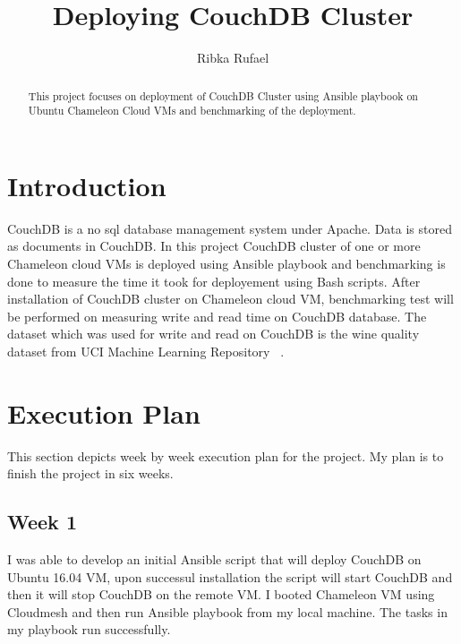 \title{Deploying CouchDB Cluster}


\author{Ribka Rufael}
\orcid{}



\renewcommand{\shortauthors}{R. Rufael}


\begin{abstract}
  This project focuses on deployment of CouchDB Cluster using Ansible
  playbook on Ubuntu Chameleon Cloud VMs and benchmarking of the
  deployment.
\end{abstract}



\maketitle

\section{Introduction}

CouchDB \cite{www-Couchdb} is a no sql database management system
under Apache. Data is stored as documents in CouchDB. In this project
CouchDB cluster of one or more Chameleon cloud VMs is deployed using
Ansible playbook and benchmarking is done to measure the time it took
for deployement using Bash scripts. After installation of CouchDB
cluster on Chameleon cloud VM, benchmarking test will be performed on
measuring write and read time on CouchDB database. The dataset which
was used for write and read on CouchDB is the wine quality dataset
from UCI Machine Learning Repository  ~\cite{www-WineQuality}.

\section{Execution Plan}

This section depicts week by week execution plan for the project. My
plan is to finish the project in six weeks.

\subsection{Week 1}

I was able to develop an initial Ansible script that will deploy
CouchDB on Ubuntu 16.04 VM, upon successul installation the script
will start CouchDB and then it will stop CouchDB on the remote VM. I
booted Chameleon VM using Cloudmesh and then run Ansible playbook from
my local machine. The tasks in my playbook run successfully.

